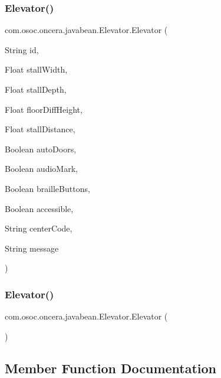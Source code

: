 \subsubsection{\texorpdfstring{Elevator()}{Elevator()}\hspace{0.1cm}{\footnotesize\ttfamily [1/2]}}
{\footnotesize\ttfamily com.\+osoc.\+oncera.\+javabean.\+Elevator.\+Elevator (\begin{DoxyParamCaption}\item[{String}]{id,  }\item[{Float}]{stall\+Width,  }\item[{Float}]{stall\+Depth,  }\item[{Float}]{floor\+Diff\+Height,  }\item[{Float}]{stall\+Distance,  }\item[{Boolean}]{auto\+Doors,  }\item[{Boolean}]{audio\+Mark,  }\item[{Boolean}]{braille\+Buttons,  }\item[{Boolean}]{accessible,  }\item[{String}]{center\+Code,  }\item[{String}]{message }\end{DoxyParamCaption})}

\mbox{\label{classcom_1_1osoc_1_1oncera_1_1javabean_1_1_elevator_a32bf2808a2d2ce284441ee25d48b0cb3}} 
\subsubsection{\texorpdfstring{Elevator()}{Elevator()}\hspace{0.1cm}{\footnotesize\ttfamily [2/2]}}
{\footnotesize\ttfamily com.\+osoc.\+oncera.\+javabean.\+Elevator.\+Elevator (\begin{DoxyParamCaption}{ }\end{DoxyParamCaption})}



\subsection{Member Function Documentation}
\mbox{\label{classcom_1_1osoc_1_1oncera_1_1javabean_1_1_elevator_a2aaf75214265b04cde7e70e7ddd060de}} 
